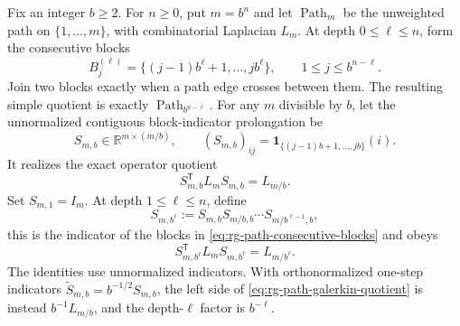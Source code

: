 Fix an integer \(b\geq2\).  For \(n\geq0\), put \(m=b^n\) and let
\(\operatorname{Path}_m\)
be the unweighted path on \(\{1,\ldots,m\}\), with combinatorial Laplacian
\(L_m\).  At depth \(0\leq\ell\leq n\), form the consecutive blocks
\begin{equation}
B_j^{(\ell)}
=\{(j-1)b^\ell+1,\ldots,jb^\ell\},
\qquad
1\leq j\leq b^{n-\ell}.
\label{eq:rg-path-consecutive-blocks}
\end{equation}
Join two blocks exactly when a path edge crosses between them.  The resulting
simple quotient is exactly \(\operatorname{Path}_{b^{n-\ell}}\).
For any \(m\) divisible by \(b\), let the unnormalized contiguous
block-indicator prolongation be
\begin{equation}
S_{m,b}\in\mathbb R^{m\times(m/b)},
\qquad
(S_{m,b})_{ij}
=\mathbf1_{\{(j-1)b+1,\ldots,jb\}}(i).
\label{eq:rg-path-block-indicator}
\end{equation}
It realizes the exact operator quotient
\begin{equation}
S_{m,b}^{\mathsf T}L_mS_{m,b}=L_{m/b}.
\label{eq:rg-path-galerkin-quotient}
\end{equation}
Set \(S_{m,1}=I_m\).  At depth \(1\leq\ell\leq n\), define
\begin{equation}
S_{m,b^\ell}
:=S_{m,b}S_{m/b,b}\cdots S_{m/b^{\ell-1},b},
\label{eq:rg-path-depth-block-indicator}
\end{equation}
this is the indicator of the blocks in
\eqref{eq:rg-path-consecutive-blocks} and obeys
\begin{equation}
S_{m,b^\ell}^{\mathsf T}L_mS_{m,b^\ell}=L_{m/b^\ell}.
\label{eq:rg-path-depth-galerkin-quotient}
\end{equation}
The identities use unnormalized indicators.  With orthonormalized one-step
indicators \(\widetilde S_{m,b}=b^{-1/2}S_{m,b}\), the left side of
\eqref{eq:rg-path-galerkin-quotient} is instead \(b^{-1}L_{m/b}\), and the
depth-\(\ell\) factor is \(b^{-\ell}\).

